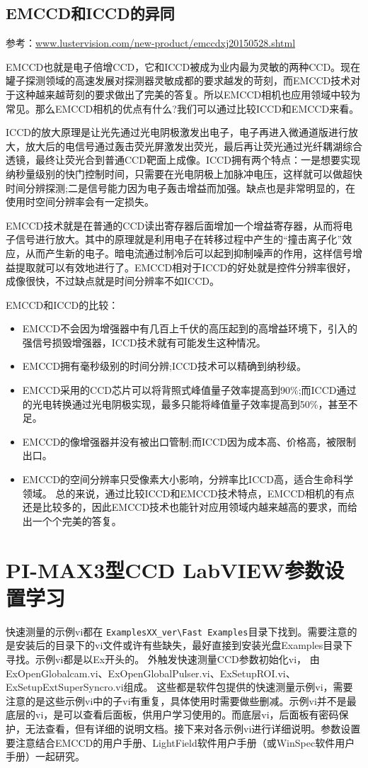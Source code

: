 \subsection{EMCCD和ICCD的异同}
参考：\url{www.lustervision.com/new-product/emccdxj20150528.shtml}

EMCCD也就是电子倍增CCD，它和ICCD被成为业内最为灵敏的两种CCD。现在罐子探测领域的高速发展对探测器灵敏成都的要求越发的苛刻，而EMCCD技术对于这种越来越苛刻的要求做出了完美的答复。所以EMCCD相机也应用领域中较为常见。那么EMCCD相机的优点有什么?我们可以通过比较ICCD和EMCCD来看。

ICCD的放大原理是让光先通过光电阴极激发出电子，电子再进入微通道版进行放大，放大后的电信号通过轰击荧光屏激发出荧光，最后再让荧光通过光纤耦湖综合透镜，最终让荧光合到普通CCD靶面上成像。ICCD拥有两个特点：一是想要实现纳秒量级别的快门控制时间，只需要在光电阴极上加脉冲电压，这样就可以做超快时间分辨探测;二是信号能力因为电子轰击增益而加强。缺点也是非常明显的，在使用时空间分辨率会有一定损失。

EMCCD技术就是在普通的CCD读出寄存器后面增加一个增益寄存器，从而将电子信号进行放大。其中的原理就是利用电子在转移过程中产生的“撞击离子化”效应，从而产生新的电子。暗电流通过制冷后可以起到抑制噪声的作用，这样信号增益提取就可以有效地进行了。EMCCD相对于ICCD的好处就是控件分辨率很好，成像很快，不过缺点就是时间分辨率不如ICCD。

EMCCD和ICCD的比较：
\begin{itemize}
\item EMCCD不会因为增强器中有几百上千伏的高压起到的高增益环境下，引入的强信号损毁增强器，ICCD技术就有可能发生这种情况。
\item EMCCD拥有毫秒级别的时间分辨;ICCD技术可以精确到纳秒级。
\item EMCCD采用的CCD芯片可以将背照式峰值量子效率提高到90\%;而ICCD通过的光电转换通过光电阴极实现，最多只能将峰值量子效率提高到50\%，甚至不足。
\item EMCCD的像增强器并没有被出口管制;而ICCD因为成本高、价格高，被限制出口。
\item EMCCD的空间分辨率只受像素大小影响，分辨率比ICCD高，适合生命科学领域。
总的来说，通过比较ICCD和EMCCD技术特点，EMCCD相机的有点还是比较多的，因此EMCCD技术也能针对应用领域内越来越高的要求，而给出一个个完美的答复。
\end{itemize}




\section{PI-MAX3型CCD LabVIEW参数设置学习}
快速测量的示例vi都在 \verb|ExamplesXX_ver\Fast Examples|目录下找到。需要注意的是安装后的目录下的vi文件或许有些缺失，最好直接到安装光盘Examples目录下寻找。示例vi都是以Ex开头的。
%
外触发快速测量CCD参数初始化vi，
由ExOpenGlobalcam.vi、ExOpenGlobalPulser.vi、ExSetupROI.vi、ExSetupExtSuperSyncro.vi组成。
这些都是软件包提供的快速测量示例vi，需要注意的是这些示例vi中的子vi有重复，具体使用时需要做些删减。示例vi并不是最底层的vi，是可以查看后面板，供用户学习使用的。而底层vi，后面板有密码保护，无法查看，但有详细的说明文档。接下来对各示例vi进行详细说明。参数设置要注意结合EMCCD的用户手册、LightField软件用户手册（或WinSpec软件用户手册）一起研究。

